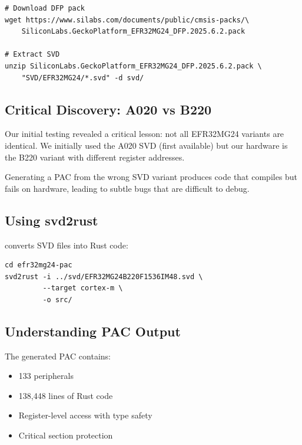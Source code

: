 \begin{verbatim}
# Download DFP pack
wget https://www.silabs.com/documents/public/cmsis-packs/\
    SiliconLabs.GeckoPlatform_EFR32MG24_DFP.2025.6.2.pack

# Extract SVD
unzip SiliconLabs.GeckoPlatform_EFR32MG24_DFP.2025.6.2.pack \
    "SVD/EFR32MG24/*.svd" -d svd/
\end{verbatim}

\subsection{Critical Discovery: A020 vs B220}
\label{subsec:svd-variant-discovery}

Our initial testing revealed a critical lesson: not all EFR32MG24 variants are identical. We initially used the A020 SVD (first available) but our hardware is the B220 variant with different register addresses.

\begin{warning}
    Generating a PAC from the wrong SVD variant produces code that compiles but fails on hardware, leading to subtle bugs that are difficult to debug.
\end{warning}

\subsection{Using svd2rust}
\label{subsec:using-svd2rust}

 converts SVD files into Rust code:

\begin{verbatim}
cd efr32mg24-pac
svd2rust -i ../svd/EFR32MG24B220F1536IM48.svd \
         --target cortex-m \
         -o src/
\end{verbatim}

\subsection{Understanding PAC Output}
\label{subsec:pac-output}

The generated PAC contains:

\begin{itemize}
    \item 133 peripherals
    \item 138,448 lines of Rust code
    \item Register-level access with type safety
    \item Critical section protection
\end{itemize}

